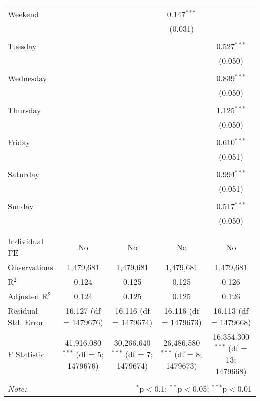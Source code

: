 \documentclass[
]{article}
\begin{document}
\begin{table}[!htbp]
{\begin{tabular}{@{\extracolsep{5pt}}lcccc}
  & & & & \\ 
 Weekend &  &  & 0.147$^{***}$ &  \\ 
  &  &  & (0.031) &  \\ 
  & & & & \\ 
 Tuesday &  &  &  & 0.527$^{***}$ \\ 
  &  &  &  & (0.050) \\ 
  & & & & \\ 
 Wednesday &  &  &  & 0.839$^{***}$ \\ 
  &  &  &  & (0.050) \\ 
  & & & & \\ 
 Thursday &  &  &  & 1.125$^{***}$ \\ 
  &  &  &  & (0.050) \\ 
  & & & & \\ 
 Friday &  &  &  & 0.610$^{***}$ \\ 
  &  &  &  & (0.051) \\ 
  & & & & \\ 
 Saturday &  &  &  & 0.994$^{***}$ \\ 
  &  &  &  & (0.051) \\ 
  & & & & \\ 
 Sunday &  &  &  & 0.517$^{***}$ \\ 
  &  &  &  & (0.050) \\ 
  & & & & \\ 
\hline \\[-1.8ex] 
Individual FE & No & No & No & No \\ 
Observations & 1,479,681 & 1,479,681 & 1,479,681 & 1,479,681 \\ 
R$^{2}$ & 0.124 & 0.125 & 0.125 & 0.126 \\ 
Adjusted R$^{2}$ & 0.124 & 0.125 & 0.125 & 0.126 \\ 
Residual Std. Error & 16.127 (df = 1479676) & 16.116 (df = 1479674) & 16.116 (df = 1479673) & 16.113 (df = 1479668) \\ 
F Statistic & 41,916.080$^{***}$ (df = 5; 1479676) & 30,266.640$^{***}$ (df = 7; 1479674) & 26,486.580$^{***}$ (df = 8; 1479673) & 16,354.300$^{***}$ (df = 13; 1479668) \\ 
\hline 
\hline \\[-1.8ex] 
\textit{Note:}  & \multicolumn{4}{r}{$^{*}$p$<$0.1; $^{**}$p$<$0.05; $^{***}$p$<$0.01} \\ 
\end{tabular}
} 
\end{table} 
\newpage
\end{document}
